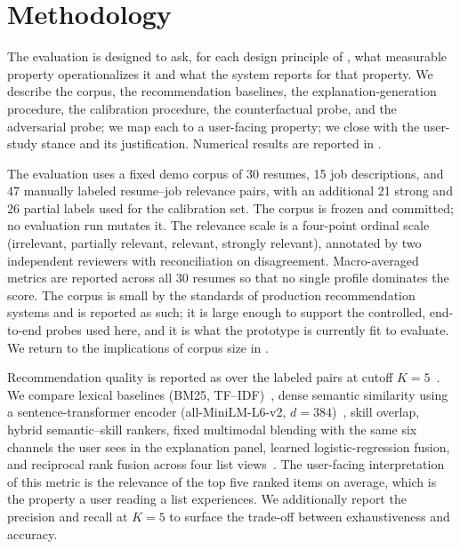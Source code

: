 \section{Methodology}\label{sec:6}

The evaluation is designed to ask, for each design principle of , what measurable property operationalizes it and what the system reports for that property.
We describe the corpus, the recommendation baselines, the explanation-generation procedure, the calibration procedure, the counterfactual probe, and the adversarial probe; we map each to a user-facing property; we close with the user-study stance and its justification.
Numerical results are reported in .

The evaluation uses a fixed demo corpus of 30 resumes, 15 job descriptions, and 47 manually labeled resume--job relevance pairs, with an additional 21 strong and 26 partial labels used for the calibration set.
The corpus is frozen and committed; no evaluation run mutates it.
The relevance scale is a four-point ordinal scale (irrelevant, partially relevant, relevant, strongly relevant), annotated by two independent reviewers with reconciliation on disagreement.
Macro-averaged metrics are reported across all 30 resumes so that no single profile dominates the score.
The corpus is small by the standards of production recommendation systems and is reported as such; it is large enough to support the controlled, end-to-end probes used here, and it is what the prototype is currently fit to evaluate.
We return to the implications of corpus size in .

Recommendation quality is reported as \ndcg{} over the labeled pairs at cutoff $K{=}5$~\cite{jarvelin2002ndcg}.
We compare lexical baselines (BM25, TF--IDF)~\cite{robertson1995okapi}, dense semantic similarity using a sentence-transformer encoder (all-MiniLM-L6-v2, $d{=}384$)~\cite{reimers2019sentence}, skill overlap, hybrid semantic--skill rankers, fixed multimodal blending with the same six channels the user sees in the explanation panel, learned logistic-regression fusion, and reciprocal rank fusion across four list views~\cite{cormack2010reciprocal}.
The user-facing interpretation of this metric is the relevance of the top five ranked items on average, which is the property a user reading a list experiences.
We additionally report the precision and recall at $K{=}5$ to surface the trade-off between exhaustiveness and accuracy.


